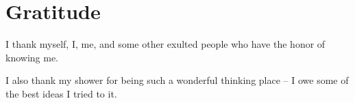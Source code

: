 \section*{Gratitude}

I thank myself, I, me, and some other exulted people who have the honor of knowing me.

I also thank my shower for being such a wonderful thinking place – I owe some of the best ideas I tried to it.
